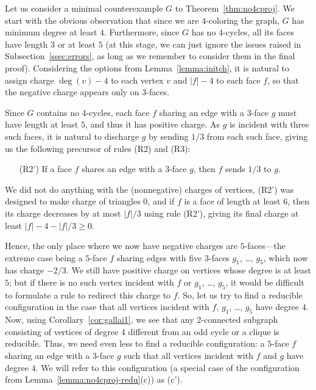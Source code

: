 \documentclass[12pt,twoside,openright,a4paper]{book}
\begin{document}
Let us consider a minimal counterexample $G$ to Theorem~\ref{thm:no4cproj}.
We start with the obvious observation that since we are $4$-coloring the graph, $G$ has minimum degree at least $4$.
Furthermore, since $G$ has no $4$-cycles, all its faces have length $3$ or at least $5$ (at this stage, we can just
ignore the issues raised in Subsection~\ref{ssec:errors}, as long as we remember to consider them in the final proof).
Considering the options from Lemma~\ref{lemma:initch}, it is natural to assign charge $\deg(v)-4$ to each vertex $v$
and $|f|-4$ to each face $f$, so that the negative charge appears only on $3$-faces.

Since $G$ contains no $4$-cycles, each face $f$ sharing an edge with a $3$-face $g$ must have length at least $5$, and thus it has positive charge.
As $g$ is incident with three such faces, it is natural to discharge $g$ by sending $1/3$ from each such face, giving
us the following precursor of rules (R2) and (R3):
\begin{itemize}
\item[(R2')] If a face $f$ shares an edge with a $3$-face $g$, then $f$ sends $1/3$ to $g$.
\end{itemize}
We did not do anything with the (nonnegative) charges of vertices, (R2') was designed to make charge of triangles $0$,
and if $f$ is a face of length at least $6$, then its charge decreases by at most $|f|/3$ using rule (R2'),
giving its final charge at least $|f|-4-|f|/3\ge 0$.

Hence, the only place where we now have negative charges are $5$-faces---the extreme case being a $5$-face $f$ sharing
edges with five $3$-faces $g_1$, \ldots, $g_5$, which now has charge $-2/3$.  We still have positive charge on vertices
whose degree is at least $5$; but if there is no such vertex incident with $f$ or $g_1$, \ldots, $g_5$, it would be difficult
to formulate a rule to redirect this charge to $f$.  So, let us try to find a reducible configuration in the case that
all vertices incident with $f$, $g_1$, \ldots, $g_5$ have degree $4$.  Now, using Corollary~\ref{cor:gallai1}, we see that
any $2$-connected subgraph consisting of vertices of degree $4$ different from an odd cycle or a clique is reducible.  Thus, we need even
less to find a reducible configuration: a $5$-face $f$ sharing an edge with a $3$-face $g$ such that all vertices incident with $f$
and $g$ have degree $4$.  We will refer to this configuration (a special case of the configuration from Lemma~\ref{lemma:no4cproj-redu}(c))
as (c').
\end{document}
